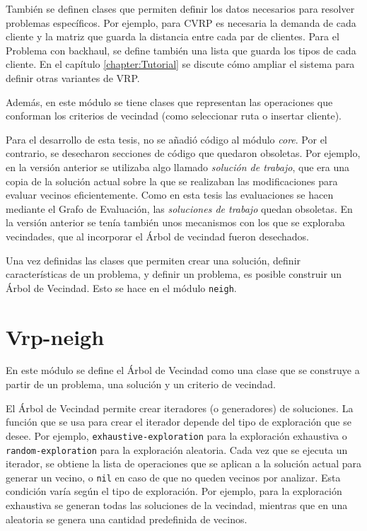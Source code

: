 También se definen clases que permiten definir los datos necesarios para resolver problemas específicos. Por ejemplo, para CVRP es necesaria la demanda de cada cliente y la matriz que guarda la distancia entre cada par de clientes. Para el Problema con backhaul, se define también una lista que guarda los tipos de cada cliente. En el capítulo \ref{chapter:Tutorial} se discute cómo ampliar el sistema para definir otras variantes de VRP.

Además, en este módulo se tiene clases que representan las operaciones que conforman los criterios de vecindad (como seleccionar ruta o insertar cliente).

Para el desarrollo de esta tesis, no se añadió código al módulo \textit{core}. Por el contrario, se desecharon secciones de código que quedaron obsoletas. Por ejemplo, en la versión anterior se utilizaba algo llamado \textit{solución de trabajo}, que era una copia de la solución actual sobre la que se realizaban las modificaciones para evaluar vecinos eficientemente. Como en esta tesis las evaluaciones se hacen mediante el Grafo de Evaluación, las \textit{soluciones de trabajo} quedan obsoletas. En la versión anterior se tenía también unos mecanismos con los que se exploraba vecindades, que al incorporar el Árbol de vecindad fueron desechados.

Una vez definidas las clases que permiten crear una solución, definir características de un problema, y definir un problema, es posible construir un Árbol de Vecindad. Esto se hace en el módulo \texttt{neigh}.

\section{Vrp-neigh}\label{2-neigh}
En este módulo se define el Árbol de Vecindad como una clase que se construye a partir de un problema, una solución y un criterio de vecindad. 

El Árbol de Vecindad permite crear iteradores (o generadores) de soluciones. La función que se usa para crear el iterador depende del tipo de exploración que se desee. Por ejemplo, \texttt{exhaustive-exploration} para la exploración exhaustiva o \texttt{random-exploration} para la exploración aleatoria. Cada vez que se ejecuta un iterador, se obtiene la lista de operaciones que se aplican a la solución actual para generar un vecino, o \texttt{nil} en caso de que no queden vecinos por analizar. Esta condición varía según el tipo de exploración. Por ejemplo, para la exploración exhaustiva se generan todas las soluciones de la vecindad, mientras que en una aleatoria se genera una cantidad predefinida de vecinos. 

